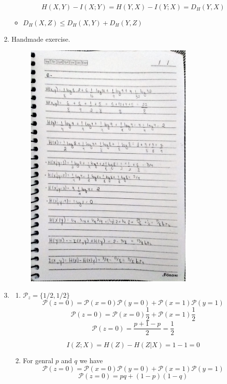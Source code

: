 \documentclass{article}
\begin{document}
\begin{enumerate}
\begin{itemize}
		            \[H(X, Y) - I(X;Y) = H(Y, X) - I(Y; X) = D_H(Y, X)\]
		      \item \(D_H(X, Z) \leq  D_H(X, Y) + D_H(Y, Z)\)
	      \end{itemize}
	\item Handmade exercise.
	      \begin{figure}[H]
		      \centering
		      \includegraphics[width=0.8\textwidth]{images/6.jpg}
	      \end{figure}
	\item
	      \begin{enumerate}
		      \item \(\mathcal{P}_z = \{1/2, 1/2\}\)
		            \[\mathcal{P}(z = 0) = \mathcal{P}(x = 0) \mathcal{P}(y = 0) +\mathcal{P}(x = 1) \mathcal{P}(y = 1)\]
		            \[\mathcal{P}(z = 0) = \mathcal{P}(x = 0) \frac{1}{2} +\mathcal{P}(x = 1) \frac{1}{2}\]
		            \[\mathcal{P}(z = 0) = \frac{p + 1 - p}{2} = \frac{1}{2}\]

		            \[I(Z; X) = H(Z) - H(Z|X) = 1 - 1 = 0\]
		      \item For genral \(p\) and \(q\) we have
		            \[\mathcal{P}(z = 0) = \mathcal{P}(x = 0) \mathcal{P}(y = 0) +\mathcal{P}(x = 1) \mathcal{P}(y = 1)\]
		            \[\mathcal{P}(z = 0) = pq + (1 - p)(1 - q)\]


\end{enumerate}
\end{enumerate}
\end{document}
